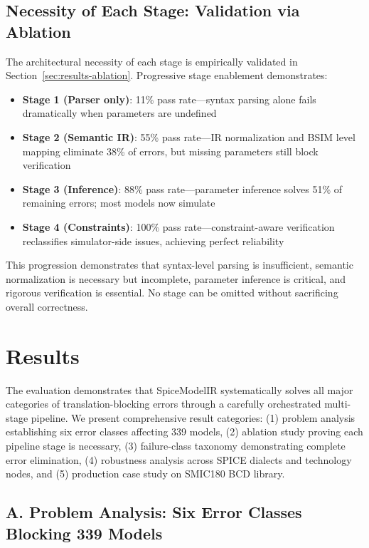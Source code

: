 \documentclass[conference]{IEEEtran}
\begin{document}
\subsection{Necessity of Each Stage: Validation via Ablation}

The architectural necessity of each stage is empirically validated in Section~\ref{sec:results-ablation}. Progressive stage enablement demonstrates:
\begin{itemize}
\item \textbf{Stage 1 (Parser only)}: 11\% pass rate---syntax parsing alone fails dramatically when parameters are undefined
\item \textbf{Stage 2 (Semantic IR)}: 55\% pass rate---IR normalization and BSIM level mapping eliminate 38\% of errors, but missing parameters still block verification
\item \textbf{Stage 3 (Inference)}: 88\% pass rate---parameter inference solves 51\% of remaining errors; most models now simulate
\item \textbf{Stage 4 (Constraints)}: 100\% pass rate---constraint-aware verification reclassifies simulator-side issues, achieving perfect reliability
\end{itemize}

This progression demonstrates that syntax-level parsing is insufficient, semantic normalization is necessary but incomplete, parameter inference is critical, and rigorous verification is essential. No stage can be omitted without sacrificing overall correctness.

\section{Results}
\label{sec:results}

The evaluation demonstrates that SpiceModelIR systematically solves all major categories of translation-blocking errors through a carefully orchestrated multi-stage pipeline. We present comprehensive result categories: (1) problem analysis establishing six error classes affecting 339 models, (2) ablation study proving each pipeline stage is necessary, (3) failure-class taxonomy demonstrating complete error elimination, (4) robustness analysis across SPICE dialects and technology nodes, and (5) production case study on SMIC180 BCD library.

\subsection{A. Problem Analysis: Six Error Classes Blocking 339 Models}
\label{sec:results-problem}
\end{document}
